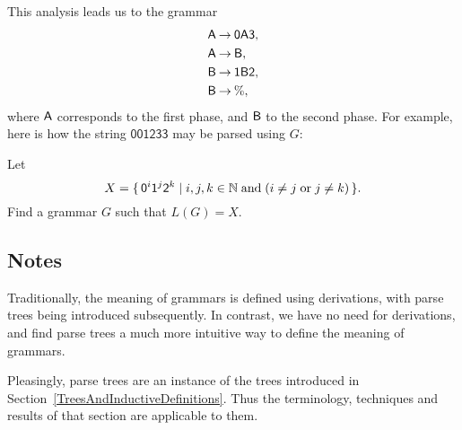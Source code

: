 This analysis leads us to the grammar
\begin{align*}
\mathsf{A} &\mathbin{\to} \mathsf{0}\mathsf{A}\mathsf{3} , \\
\mathsf{A} &\mathbin{\to} \mathsf{B} , \\
\mathsf{B} &\mathbin{\to} \mathsf{1}\mathsf{B}\mathsf{2} , \\
\mathsf{B} &\mathbin{\to} \% ,
\end{align*}
where $\mathsf{A}$ corresponds to the first phase, and $\mathsf{B}$ to the
second phase.
For example, here is how the string $\mathsf{001233}$ may be
parsed using $G$:
\begin{center}

\end{center}

\begin{exercise}
Let
\begin{displaymath}
X = \{ \, \mathsf{0}^i\mathsf{1}^j\mathsf{2}^k \mid i,j,k\in\mathbb{N}\;\allowbreak\mbox{and}\allowbreak\;
(i\neq j\;\allowbreak\mbox{or}\allowbreak\;j\neq k) \, \} .
\end{displaymath}
Find a grammar $G$ such that $L(G)=X$.
\end{exercise}

\subsection{Notes}

Traditionally, the meaning of grammars is defined using derivations,
with parse trees being introduced subsequently.  In contrast, we have
no need for derivations, and find parse trees a much more intuitive
way to define the meaning of grammars.

Pleasingly, parse trees are an instance of the trees introduced in
Section~\ref{TreesAndInductiveDefinitions}.  Thus the terminology,
techniques and results of that section are applicable to them.

